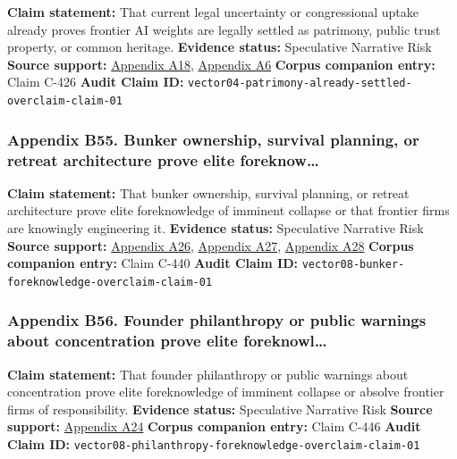 \documentclass[
  american,
  11pt,
  letterpaper,
]{article}
\begin{document}
\textbf{Claim statement:} That current legal uncertainty or
congressional uptake already proves frontier AI weights are legally
settled as patrimony, public trust property, or common heritage.
\textbf{Evidence status:} Speculative Narrative Risk \textbf{Source
support:}
\hyperref[ch-10-appendix-a18-bipartisan-house-task-force-report-on-artificial-intelligence]{Appendix
A18},
\hyperref[ch-10-appendix-a6-copyright-and-artificial-intelligence-part-3-generative-ai-training-pre-publication-version]{Appendix
A6} \textbf{Corpus companion entry:} Claim C-426 \textbf{Audit Claim
ID:} \texttt{vector04-patrimony-already-settled-overclaim-claim-01}

\subsubsection{Appendix B55. Bunker ownership, survival planning, or
retreat architecture prove elite
foreknow\ldots{}}\label{ch-10-appendix-b55-bunker-ownership-survival-planning-or-retreat-architecture-prove-elite-foreknow}

\textbf{Claim statement:} That bunker ownership, survival planning, or
retreat architecture prove elite foreknowledge of imminent collapse or
that frontier firms are knowingly engineering it. \textbf{Evidence
status:} Speculative Narrative Risk \textbf{Source support:}
\hyperref[ch-10-appendix-a26-sam-altman-s-manifest-destiny]{Appendix
A26},
\hyperref[ch-10-appendix-a27-inside-mark-zuckerbergs-top-secret-hawaii-compound]{Appendix
A27},
\hyperref[ch-10-appendix-a28-new-zealand-woos-the-wealthy-with-golden-visa-changes]{Appendix
A28} \textbf{Corpus companion entry:} Claim C-440 \textbf{Audit Claim
ID:} \texttt{vector08-bunker-foreknowledge-overclaim-claim-01}

\subsubsection{Appendix B56. Founder philanthropy or public warnings
about concentration prove elite
foreknowl\ldots{}}\label{ch-10-appendix-b56-founder-philanthropy-or-public-warnings-about-concentration-prove-elite-foreknowl}

\textbf{Claim statement:} That founder philanthropy or public warnings
about concentration prove elite foreknowledge of imminent collapse or
absolve frontier firms of responsibility. \textbf{Evidence status:}
Speculative Narrative Risk \textbf{Source support:}
\hyperref[ch-10-appendix-a24-the-adolescence-of-technology]{Appendix
A24} \textbf{Corpus companion entry:} Claim C-446 \textbf{Audit Claim
ID:} \texttt{vector08-philanthropy-foreknowledge-overclaim-claim-01}
\end{document}
